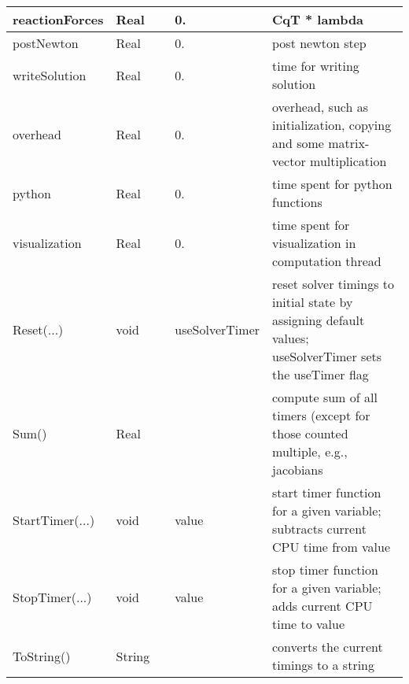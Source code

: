 \begin{center}
\begin{longtable}{| p{4.2cm} | p{2.5cm} | p{0.3cm} | p{3.0cm} | p{6cm} |}
    reactionForces &     Real &      &     0. &     CqT * lambda\\ \hline
    postNewton &     Real &      &     0. &     post newton step\\ \hline
    writeSolution &     Real &      &     0. &     time for writing solution\\ \hline
    overhead &     Real &      &     0. &     overhead, such as initialization, copying and some matrix-vector multiplication\\ \hline
    python &     Real &      &     0. &     time spent for python functions\\ \hline
    visualization &     Real &      &     0. &     time spent for visualization in computation thread\\ \hline
    Reset(...) &     void &      &     useSolverTimer &     reset solver timings to initial state by assigning default values; useSolverTimer sets the useTimer flag\\ \hline
    Sum() &     Real &      &      &     compute sum of all timers (except for those counted multiple, e.g., jacobians\\ \hline
    StartTimer(...) &     void &      &     value &     start timer function for a given variable; subtracts current CPU time from value\\ \hline
    StopTimer(...) &     void &      &     value &     stop timer function for a given variable; adds current CPU time to value\\ \hline
    ToString() &     String &      &      &     converts the current timings to a string\\ \hline
	  \end{longtable}
	\end{center}

